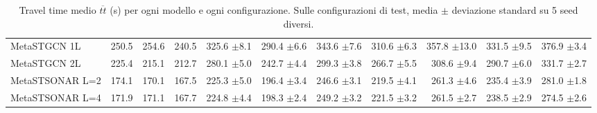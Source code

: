 \begin{table}
\begin{tabular}{@{}lrrrrrrrrrr@{}}
    MetaSTGCN 1L              & 250.5   & 254.6   & 240.5   & 325.6 {\fontsize{4}{4}\selectfont$\pm$8.1} & 290.4 {\fontsize{4}{4}\selectfont$\pm$6.6} & 343.6 {\fontsize{4}{4}\selectfont$\pm$7.6} & 310.6 {\fontsize{4}{4}\selectfont$\pm$6.3}  & 357.8 {\fontsize{4}{4}\selectfont$\pm$13.0} & 331.5 {\fontsize{4}{4}\selectfont$\pm$9.5} & 376.9 {\fontsize{4}{4}\selectfont$\pm$3.4} \\
    MetaSTGCN 2L              & 225.4   & 215.1   & 212.7   & 280.1 {\fontsize{4}{4}\selectfont$\pm$5.0} & 242.7 {\fontsize{4}{4}\selectfont$\pm$4.4} & 299.3 {\fontsize{4}{4}\selectfont$\pm$3.8} & 266.7 {\fontsize{4}{4}\selectfont$\pm$5.5}  & 308.6 {\fontsize{4}{4}\selectfont$\pm$9.4} & 290.7 {\fontsize{4}{4}\selectfont$\pm$6.0} & 331.7 {\fontsize{4}{4}\selectfont$\pm$2.7} \\
    MetaSTSONAR L=2           & 174.1   & 170.1   & 167.5   & 225.3 {\fontsize{4}{4}\selectfont$\pm$5.0} & 196.4 {\fontsize{4}{4}\selectfont$\pm$3.4} & 246.6 {\fontsize{4}{4}\selectfont$\pm$3.1} & 219.5 {\fontsize{4}{4}\selectfont$\pm$4.1}  & 261.3 {\fontsize{4}{4}\selectfont$\pm$4.6} & 235.4 {\fontsize{4}{4}\selectfont$\pm$3.9} & 281.0 {\fontsize{4}{4}\selectfont$\pm$1.8} \\
    MetaSTSONAR L=4           & 171.9   & 171.1   & 167.7   & 224.8 {\fontsize{4}{4}\selectfont$\pm$4.4} & 198.3 {\fontsize{4}{4}\selectfont$\pm$2.4} & 249.2 {\fontsize{4}{4}\selectfont$\pm$3.2} & 221.5 {\fontsize{4}{4}\selectfont$\pm$3.2}  & 261.5 {\fontsize{4}{4}\selectfont$\pm$2.7} & 238.5 {\fontsize{4}{4}\selectfont$\pm$2.9} & 274.5 {\fontsize{4}{4}\selectfont$\pm$2.6} \\
    \bottomrule
  \end{tabular}
  \caption{Travel time medio $\overline{tt}$ (s) per ogni modello e ogni configurazione. Sulle configurazioni di test, media $\pm$ deviazione standard su 5 seed diversi.}
  \label{tab:ttmedio-full}
\end{table}

